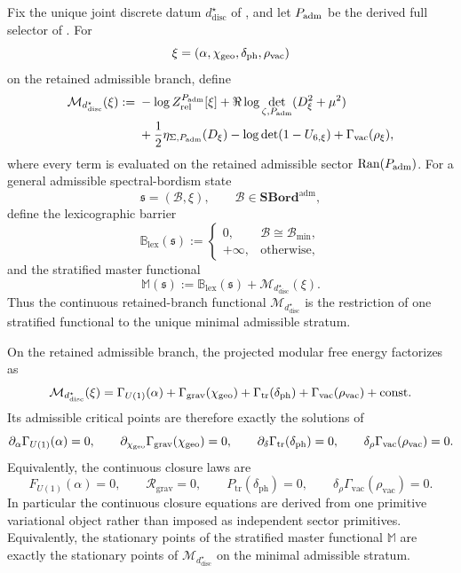 \begin{definition}
\label{def:projected-modular-free-energy}
Fix the unique joint discrete datum $d^\star_{\mathrm{disc}}$ of
, and let $P_{\mathrm{adm}}$ be the derived full selector of
. For
\[
\xi=(\alpha,\chi_{\mathrm{geo}},\delta_{\mathrm{ph}},\rho_{\mathrm{vac}})
\]
on the retained admissible branch, define
\[
\begin{aligned}
\mathcal M_{d^\star_{\mathrm{disc}}}(\xi)
:={}&-\log Z^{P_{\mathrm{adm}}}_{\mathrm{rel}}[\xi]
+\Re\log\det_{\zeta,P_{\mathrm{adm}}}(D_\xi^2+\mu^2)\\
&+\frac12\eta_{\Sigma,P_{\mathrm{adm}}}(D_\xi)
-\log\det(1-U_{6,\xi})
+\Gamma_{\mathrm{vac}}(\rho_\xi),
\end{aligned}
\]
where every term is evaluated on the retained admissible sector $\operatorname{Ran}(P_{\mathrm{adm}})$.
For a general admissible spectral-bordism state
\[
\mathfrak s=(\mathcal B,\xi),
\qquad
\mathcal B\in\mathbf{SBord}^{\mathrm{adm}},
\]
define the lexicographic barrier
\[
\mathbb B_{\mathrm{lex}}(\mathfrak s)
:=
\begin{cases}
0,& \mathcal B\cong \mathcal B_{\min},\\
+\infty,& \text{otherwise},
\end{cases}
\]
and the stratified master functional
\[
\mathbb M(\mathfrak s)
:=
\mathbb B_{\mathrm{lex}}(\mathfrak s)+\mathcal M_{d^\star_{\mathrm{disc}}}(\xi).
\]
Thus the continuous retained-branch functional $\mathcal M_{d^\star_{\mathrm{disc}}}$ is the
restriction of one stratified functional to the unique minimal admissible stratum.
\end{definition}

\begin{theorem}
\label{thm:continuous-closure-from-master-functional}
On the retained admissible branch, the projected modular free energy factorizes as
\[
\mathcal M_{d^\star_{\mathrm{disc}}}(\xi)
=
\Gamma_{U(1)}(\alpha)
+
\Gamma_{\mathrm{grav}}(\chi_{\mathrm{geo}})
+
\Gamma_{\mathrm{tr}}(\delta_{\mathrm{ph}})
+
\Gamma_{\mathrm{vac}}(\rho_{\mathrm{vac}})
+\mathrm{const}.
\]
Its admissible critical points are therefore exactly the solutions of
\[
\partial_\alpha\Gamma_{U(1)}(\alpha)=0,
\qquad
\partial_{\chi_{\mathrm{geo}}}\Gamma_{\mathrm{grav}}(\chi_{\mathrm{geo}})=0,
\qquad
\partial_\delta\Gamma_{\mathrm{tr}}(\delta_{\mathrm{ph}})=0,
\qquad
\delta_\rho\Gamma_{\mathrm{vac}}(\rho_{\mathrm{vac}})=0.
\]
Equivalently, the continuous closure laws are
\[
F_{U(1)}(\alpha)=0,
\qquad
\mathcal R_{\mathrm{grav}}=0,
\qquad
P_{\mathrm{tr}}(\delta_{\mathrm{ph}})=0,
\qquad
\delta_\rho\Gamma_{\mathrm{vac}}(\rho_{\mathrm{vac}})=0.
\]
In particular the continuous closure equations are derived from one primitive variational object
rather than imposed as independent sector primitives. Equivalently, the stationary points of the
stratified master functional $\mathbb M$ are exactly the stationary points of
$\mathcal M_{d^\star_{\mathrm{disc}}}$ on the minimal admissible stratum.
\end{theorem}

